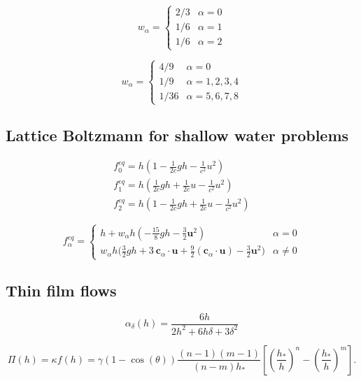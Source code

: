 \begin{equation}\label{eq:weightsD1Q3}
w_{\alpha} = \begin{cases}
2/3 &\text{$\alpha = 0$}\\
1/6 &\text{$\alpha = 1$}\\
1/6 &\text{$\alpha = 2$}
\end{cases}
\end{equation}



\begin{equation}\label{eq:weightsD2Q9}
w_{\alpha} = \begin{cases}
4/9 &\text{$\alpha = 0$}\\
1/9 &\text{$\alpha = 1,2,3,4$}\\
1/36 &\text{$\alpha = 5,6,7,8$}
\end{cases}
\end{equation}

\subsection{Lattice Boltzmann for shallow water problems}

\begin{gather}\label{eq:equilibria_D1Q3}
    f_{0}^{eq} = h\left(1-\frac{1}{2c}gh - \frac{1}{c^2}u^2\right)\nonumber\\
    f_{1}^{eq} = h\left(\frac{1}{2c}gh + \frac{1}{2c}u - \frac{1}{c^2}u^2\right)\\
    f_{2}^{eq} = h\left(1-\frac{1}{2c}gh + \frac{1}{2c}u - \frac{1}{c^2}u^2\right)\nonumber
\end{gather}

\begin{equation}\label{eq:equilibria_D2Q9}
    f_{\alpha}^{eq} =\begin{cases} 
    h + w_{\alpha}h\left(-\frac{15}{8}gh - \frac{3}{2}\mathbf{u}^2\right) &\text{$\alpha = 0$}\\
    w_{\alpha}h\Big(\frac{3}{2}gh + 3~\mathbf{c}_{\alpha}\cdot\mathbf{u} + \frac{9}{2}(\mathbf{c}_{\alpha}\cdot\mathbf{u}) - \frac{3}{2}\mathbf{u}^2\Big) &\text{$\alpha \ne 0$}
    \end{cases}
\end{equation}

\subsection{Thin film flows}


\begin{equation}\label{eq:force_slip}
    \alpha_{\delta}(h) = \frac{6h}{2h^2+6h\delta + 3\delta^2}
\end{equation}


\begin{equation}\label{eq:disjoining_pressure}
    \Pi(h) = \kappa f(h) = \gamma(1-\cos(\theta))\frac{(n-1)(m-1)}{(n-m)h_{\ast}}\left[\left(\frac{h_{\ast}}{h}\right)^n-\left(\frac{h_{\ast}}{h}\right)^m\right].
\end{equation}